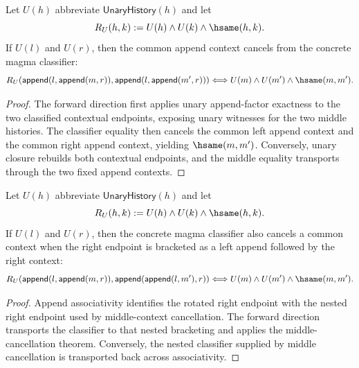 \begin{theorem}
\label{thm:concrete-unary-history-magma-classifier-append-middle-cancel}
Let $U(h)$ abbreviate $\mathsf{UnaryHistory}(h)$ and let
$$
R_U(h,k):=U(h)\land U(k)\land\hsame(h,k).
$$
If $U(l)$ and $U(r)$, then the common append context cancels from the concrete
magma classifier:
$$
R_U(\mathsf{append}(l,\mathsf{append}(m,r)),
    \mathsf{append}(l,\mathsf{append}(m',r)))
\Longleftrightarrow
U(m)\land U(m')\land \hsame(m,m').
$$
\end{theorem}
\begin{proof}
The forward direction first applies unary append-factor exactness to the two
classified contextual endpoints, exposing unary witnesses for the two middle
histories. The classifier equality then cancels the common left append context
and the common right append context, yielding $\hsame(m,m')$. Conversely, unary
closure rebuilds both contextual endpoints, and the middle equality transports
through the two fixed append contexts.
\end{proof}

\begin{theorem}
\label{thm:concrete-unary-history-magma-classifier-append-rotated-middle-cancel}
Let $U(h)$ abbreviate $\mathsf{UnaryHistory}(h)$ and let
$$
R_U(h,k):=U(h)\land U(k)\land\hsame(h,k).
$$
If $U(l)$ and $U(r)$, then the concrete magma classifier also cancels a common
context when the right endpoint is bracketed as a left append followed by the
right context:
$$
R_U(\mathsf{append}(l,\mathsf{append}(m,r)),
    \mathsf{append}(\mathsf{append}(l,m'),r))
\Longleftrightarrow
U(m)\land U(m')\land \hsame(m,m').
$$
\end{theorem}
\begin{proof}
Append associativity identifies the rotated right endpoint with the nested
right endpoint used by middle-context cancellation. The forward direction
transports the classifier to that nested bracketing and applies the
middle-cancellation theorem. Conversely, the nested classifier supplied by
middle cancellation is transported back across associativity.
\end{proof}

